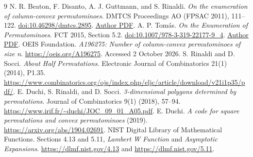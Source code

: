 \documentclass[11pt,letterpaper]{article}
\theoremstyle{remark}\newtheorem{remark}[theorem]{Remark}
\begin{document}
\begingroup\small\setlength{\parskip}{0pt}
\begin{thebibliography}{9}
 N. R. Beaton, F. Disanto, A. J. Guttmann, and S. Rinaldi.
\emph{On the enumeration of column-convex permutominoes}.
DMTCS Proceedings AO (FPSAC 2011), 111--122.
\href{https://doi.org/10.46298/dmtcs.2895}{doi:10.46298/dmtcs.2895}.
\href{https://www.nicholasbeaton.com/papers/BDGR2011.pdf}{Author PDF}.
 A. P. Tom\'as. \emph{On the Enumeration of Permutominoes}.
FCT 2015, Section 5.2.
\href{https://doi.org/10.1007/978-3-319-22177-9_4}{doi:10.1007/978-3-319-22177-9\_4}.
\href{https://cmup.fc.up.pt/main/sites/default/files/publications/aptomas_FCT2015.pdf}{Author PDF}.
 OEIS Foundation. \emph{A196275: Number of column-convex permutominoes of size n}.
\url{https://oeis.org/A196275}. Accessed 2 October 2026.
 S. Rinaldi and D. Socci. \emph{About Half Permutations}.
Electronic Journal of Combinatorics 21(1) (2014), P1.35.
\url{https://www.combinatorics.org/ojs/index.php/eljc/article/download/v21i1p35/pdf/}.
 E. Duchi, S. Rinaldi, and D. Socci.
\emph{3-dimensional polygons determined by permutations}.
Journal of Combinatorics 9(1) (2018), 57--94.
\url{https://www.irif.fr/~duchi/JOC_09_01_A05.pdf}.
 E. Duchi. \emph{A code for square permutations and convex permutominoes} (2019).
\url{https://arxiv.org/abs/1904.02691}.
 NIST Digital Library of Mathematical Functions.
Sections 4.13 and 5.11, \emph{Lambert W Function} and \emph{Asymptotic Expansions}.
\url{https://dlmf.nist.gov/4.13} and \url{https://dlmf.nist.gov/5.11}.
\end{thebibliography}
\endgroup
\end{document}
